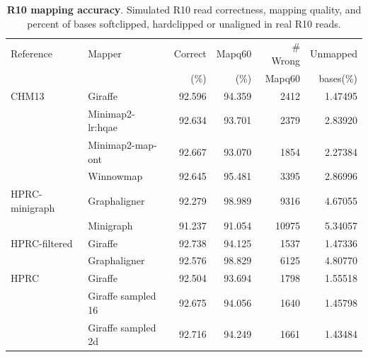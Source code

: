 \documentclass[11pt]{ucscthesis}
\begin{document}
\begin{landscape}
\begin{table}[htb]
    \centering
    \begin{tabular}{|l|l|r|r|r|r|}
    \hline
    Reference          & Mapper                 & Correct          & Mapq60             & \# Wrong            & Unmapped   \\
                       &                        & (\%)             & (\%)               & Mapq60              & bases(\%) \\
    \hline
    CHM13              & Giraffe                & 92.596      & 94.359      & 2412      & 1.47495  \\
                       & Minimap2-lr:hqae       & 92.634      & 93.701      & 2379      & 2.83920   \\
                       & Minimap2-map-ont       & 92.667      & 93.070      & 1854      & 2.27384   \\
                       & Winnowmap              & 92.645      & 95.481      & 3395      & 2.86996   \\
    HPRC-minigraph     & Graphaligner           & 92.279      & 98.989      & 9316      & 4.67055  \\
                       & Minigraph              & 91.237      & 91.054      & 10975     & 5.34057   \\
    HPRC-filtered      & Giraffe                & 92.738      & 94.125      & 1537      & 1.47336  \\
                       & Graphaligner           & 92.576      & 98.829      & 6125      & 4.80770 \\
    HPRC               & Giraffe                & 92.504      & 93.694      & 1798      & 1.55518 \\
                       & Giraffe sampled 16     & 92.675      & 94.056      & 1640      & 1.45798  \\
                       & Giraffe sampled 2d     & 92.716      & 94.249      & 1661      & 1.43484  \\
    \hline
    \end{tabular}
    \caption[R10 mapping accuracy]{\textbf{R10 mapping accuracy}. Simulated R10 read correctness, mapping quality, and percent of bases softclipped, hardclipped or unaligned in real R10 reads.}
    \label{tab:sup-r10-sim}
\end{table}


\end{landscape}
\end{document}
